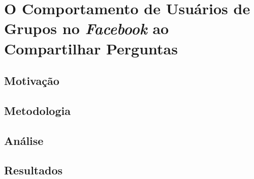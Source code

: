 \chapter{O Comportamento de Usuários de Grupos no \textit{Facebook} ao Compartilhar Perguntas}

\section{Motivação}
\section{Metodologia}
\section{Análise}
\section{Resultados}